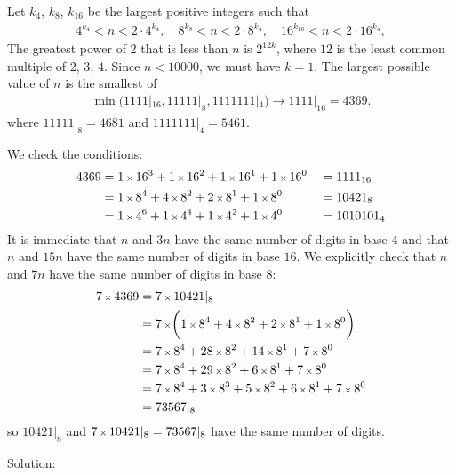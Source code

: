 Let $k_{4}$, $k_{8}$, $k_{16}$ be the largest positive integers such that
\begin{align*}
  4^{k_{4}} < n < 2 \cdot 4^{k_{4}},
\quad
  8^{k_{8}} < n < 2 \cdot 8^{k_{4}},
\quad
16^{k_{16}} < n < 2 \cdot 16^{k_{4}},
\end{align*}
The greatest power of $2$ that is less than $n$ is $2^{12k}$, where $12$ is the least common multiple of $2$, $3$, $4$. Since $n<10000$, we must have $k=1$. The largest possible value of $n$ is the smallest of 
\begin{align*}
\min( 1111|_{16},  11111|_{8}, 1111111|_{4}) 
\to 
1111|_{16} = 4369.
\end{align*}
where $11111|_{8}=4681$ and $1111111|_{4}=5461$.

We check the conditions:
\begin{alignat*}{2}
4369 
 & = 1 \mult 16^{3} + 1 \mult 16^{2} + 1 \mult 16^{1} + 1 \mult 16^{0}
 && = 1111_{16}
\\
 & = 1 \mult 8^{4} + 4 \mult 8^{2} + 2 \mult 8^{1} + 1 \mult 8^{0}
 && = 10421_{8}
\\
 & = 1 \mult 4^{6} + 1 \mult 4^{4} + 1 \mult 4^{2} + 1 \mult 4^{0} 
 && = 1010101_{4}
\end{alignat*}
It is immediate that $n$ and $3n$ have the same number of digits in base $4$ and that $n$ and $15n$ have the same number of digits in base $16$. We explicitly check that $n$ and $7n$ have the same number of digits in base $8$:
\begin{align*}
7 \mult 4369 
 & = 7 \mult 10421|_{8}
\\
 & = 7 \mult \biggl( 1 \mult 8^{4} + 4 \mult 8^{2} + 2 \mult 8^{1} + 1 \mult 8^{0} \biggr)
\\
 & = 7 \mult 8^{4} + 28 \mult 8^{2} + 14 \mult 8^{1} + 7 \mult 8^{0}
\\
 & = 7 \mult 8^{4} + 29 \mult 8^{2} + 6 \mult 8^{1} + 7 \mult 8^{0}
\\
 & = 7 \mult 8^{4} + 3 \mult 8^{3} + 5 \mult 8^{2} + 6 \mult 8^{1} + 7 \mult 8^{0}
\\
 & = 73567|_{8}
\end{align*}
so $10421|_{8}$ and $7 \mult 10421|_{8}=73567|_{8}$ have the same number of digits.

Solution: 
